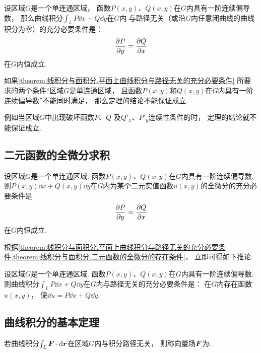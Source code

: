 \begin{theorem}\label{theorem:线积分与面积分.平面上曲线积分与路径无关的充分必要条件}
设区域\(G\)是一个单连通区域，
函数\(P(x,y)\)、\(Q(x,y)\)在\(G\)内具有一阶连续偏导数，
那么曲线积分\(\int_L P\dd{x}+Q\dd{y}\)在\(G\)内
与路径无关（或沿\(G\)内任意闭曲线的曲线积分为零）的充分必要条件是：\[
	\pdv{P}{y}=\pdv{Q}{x}
\]在\(G\)内恒成立.
\end{theorem}

如果\cref{theorem:线积分与面积分.平面上曲线积分与路径无关的充分必要条件}
所要求的两个条件“区域\(G\)是单连通区域，
且函数\(P(x,y)\)和\(Q(x,y)\)在\(G\)内具有一阶连续偏导数”不能同时满足，
那么定理的结论不能保证成立.

例如当区域\(G\)中出现破坏函数\(P\)、\(Q\)
及\(Q'_x\)、\(P'_y\)连续性条件的时，
定理的结论就不能保证成立.

\subsection{二元函数的全微分求积}
\begin{theorem}\label{theorem:线积分与面积分.二元函数的全微分的存在条件}
设区域\(G\)是一个单连通区域.
函数\(P(x,y)\)、\(Q(x,y)\)在\(G\)内具有一阶连续偏导数.
则\(P(x,y)\dd{x}+Q(x,y)\dd{y}\)在\(G\)内为某个二元实值函数\(u(x,y)\)的全微分的充分必要条件是\[
	\pdv{P}{y}=\pdv{Q}{x}
\]在\(G\)内恒成立.
\end{theorem}

根据\cref{theorem:线积分与面积分.平面上曲线积分与路径无关的充分必要条件,theorem:线积分与面积分.二元函数的全微分的存在条件}，
立即可得如下推论.
\begin{corollary}
设区域\(G\)是一个单连通区域.
函数\(P(x,y)\)、\(Q(x,y)\)在\(G\)内具有一阶连续偏导数.
则曲线积分\(\int_L P\dd{x}+Q\dd{y}\)在\(G\)内与路径无关的充分必要条件是：
在\(G\)内存在函数\(u(x,y)\)，
使\(\dd{u}=P\dd{x}+Q\dd{y}\).
\end{corollary}

\subsection{曲线积分的基本定理}
\begin{definition}
若曲线积分\(\int_L \boldsymbol{F}\cdot\dd{\boldsymbol{r}}\)在区域\(G\)内与积分路径无关，
则称向量场\(\boldsymbol{F}\)为.
\end{definition}

